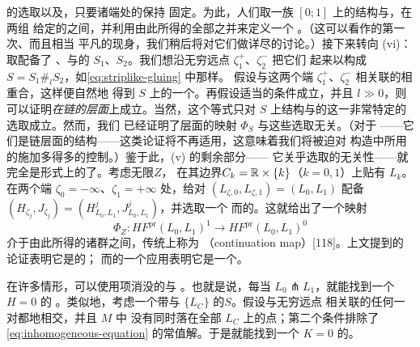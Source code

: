 \trStriplikeEnd{}的选取以及\trPerturbationDatum，只要诸端处的\trFloerDatum{}保持
固定。为此，人们取一族 $[0;1]$ 上的\trConformal{}结构与\trPerturbationDatum，在两组
给定的之间\trInterpolation，并利用由此所得的全部\trModuliSpace{}之并来定义一个%
\trChainHomotopy。（这可以看作\trParametrization\trModuliSpace{}的第一次、而且相当
平凡的现身，我们稍后将对它们做详尽的讨论。）接下来转向 (vi)：取配备了%
\trStriplikeEnd、\trLagrange\trBoundaryCondition{}与\trPerturbationDatum{}的%
\trSurface{}$S_1$、$S_2$。我们想沿无穷远点 $\zeta_1^+$、$\zeta_2^-$ 把它们%
\trGluing{}起来以构成 $S=S_1\#_l S_2$，如\eqref{eq:striplike-gluing} 中那样。
假设与这两个端 $\zeta_1^+$、$\zeta_2^-$ 相关联的\trFloerDatum{}相重合，这样便自然地
得到 $S$ 上的一个\trPerturbationDatum。再假设适当的\trRegularity{}条件成立，并且
$l\gg0$，则可以证明\trCompositionLaw\emph{在链的层面}上成立。当然，这个等式只对
$S$ 上\trConformal{}结构与\trPerturbationDatum{}的这一非常特定的选取成立。然而，我们
已经证明了\trCohomology{}层面的映射 $\Phi_S$ 与这些选取无关。（对于%
\trFukayaCategory——它们是链层面的结构——这类论证将不再适用，这意味着我们将被迫对
构造中所用的\trPerturbationDatum{}施加多得多的控制。）鉴于此，(v) 的剩余部分——
它关乎\trFloerDatum{}选取的无关性——就完全是形式上的了。考虑无限\trStrip{}$Z$，
在其边界\trConnectedComponent{}$C_k=\mathbb{R}\times\{k\}$（$k=0,1$）上贴有%
\trLagrange\trLabel{}$L_k$。在两个端 $\zeta_0=-\infty$、$\zeta_1=+\infty$ 处，给对
$(L_{\zeta,0},L_{\zeta,1})=(L_0,L_1)$ 配备\trRegular\trFloerDatum{}%
$(H_{\zeta_j},J_{\zeta_j})=(H^j_{L_0,L_1},J^j_{L_0,L_1})$，并选取一个%
\trRegular{}而\trCompatible{}的\trPerturbationDatum。这就给出了一个映射
\begin{equation*}
\Phi_Z\colon HF^{\mathrm{pr}}(L_0,L_1)^1\longrightarrow HF^{\mathrm{pr}}(L_0,L_1)^0
\end{equation*}
介于由此所得的诸\trFloerCohomology{}群之间，传统上称为\emph{\trContinuationMap}
（continuation map）[118]。上文提到的\trHomotopy{}论证表明它是\trCanonical{}的；
而\trCompositionLaw{}的一个应用表明它是一个\trIsomorphism。
\begin{remark}\label{thm:vanishing-inhomogeneous-terms}
在许多情形，可以使用\trInhomogeneous{}项消没的\trFloerDatum{}与%
\trPerturbationDatum。也就是说，每当 $L_0\pitchfork L_1$，就能找到一个 $H=0$ 的%
\trRegular\trFloerDatum。类似地，考虑一个带\trStriplikeEnd{}与%
\trLagrange\trBoundaryCondition{}$\{L_C\}$ 的\trRiemann\trSurface{}$S$。假设与无穷远点
相关联的任何一对\trLagrange\trSubmanifold{}都\trTransverse{}地相交，并且 $M$ 中
没有同时落在全部 $L_C$ 上的点；第二个条件排除了\eqref{eq:inhomogeneous-equation}
的常值解。于是就能找到一个 $K=0$ 的\trRegular\trPerturbationDatum。
\end{remark}
